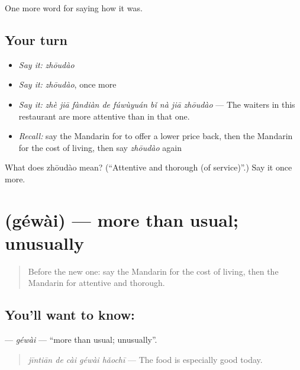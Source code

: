 \begin{grammarlens}[title={What you've built}]
One more word for saying how it was.
\end{grammarlens}

\subsection*{Your turn}
\begin{itemize}
\raggedright
  \item \emph{Say it:} \emph{zhōudào}
  \item \emph{Say it:} \emph{zhōudào}, once more
  \item \emph{Say it:} \emph{zhè jiā fàndiàn de fúwùyuán bǐ nà jiā zhōudào} — The waiters in this restaurant are more attentive than in that one.
  \item \emph{Recall:} say the Mandarin for to offer a lower price back, then the Mandarin for the cost of living, then say \emph{zhōudào} again
\end{itemize}

\begin{tcolorbox}[breakable,colback=teal!4,colframe=teal!35!black,title={Before you move on}]
What does zhōudào mean? (\textquotedblleft{}Attentive and thorough (of service)\textquotedblright{}.) Say it once more.
\end{tcolorbox}
\section[\texorpdfstring{\zh{格外} (géwài)}{格外 (géwài)}]{ (géwài) — more than usual; unusually}

\label{lesson:ZH-C525-gewai}



\begin{quote}
Before the new one: say the Mandarin for the cost of living, then the Mandarin for attentive and thorough.
\end{quote}

\subsection*{You'll want to know: }
\textbf{} — \emph{géwài} — \textquotedblleft{}more than usual; unusually\textquotedblright{}.

\begin{quote}
\textbf{} \emph{jīntiān de cài géwài hǎochī} — The food is especially good today.
\end{quote}

